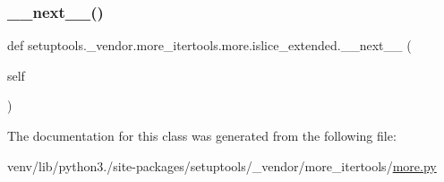 \subsubsection{\texorpdfstring{\+\_\+\+\_\+next\+\_\+\+\_\+()}{\_\_next\_\_()}}
{\footnotesize\ttfamily def setuptools.\+\_\+vendor.\+more\+\_\+itertools.\+more.\+islice\+\_\+extended.\+\_\+\+\_\+next\+\_\+\+\_\+ (\begin{DoxyParamCaption}\item[{}]{self }\end{DoxyParamCaption})}



The documentation for this class was generated from the following file\+:\begin{DoxyCompactItemize}
\item 
venv/lib/python3./site-\/packages/setuptools/\+\_\+vendor/more\+\_\+itertools/\hyperlink{more_8py}{more.\+py}\end{DoxyCompactItemize}
